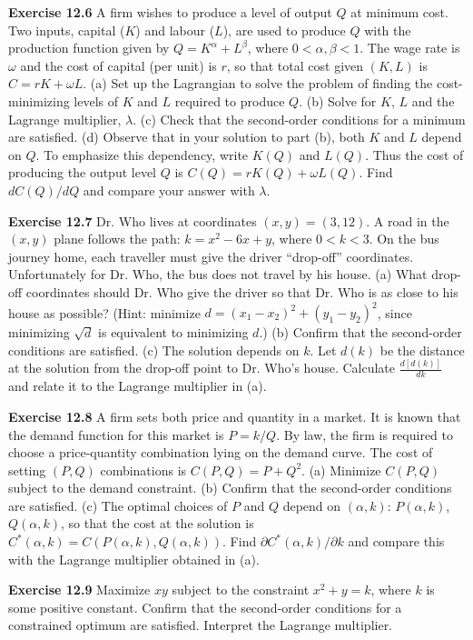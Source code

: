 \begin{original}
\textbf{Exercise 12.6} A firm wishes to produce a level of output $Q$ at minimum cost. Two inputs, capital ($K$) and labour ($L$), are used to produce $Q$ with the production function given by $Q = K^\alpha + L^\beta$, where $0 < \alpha, \beta < 1$. The wage rate is $\omega$ and the cost of capital (per unit) is $r$, so that total cost given $(K, L)$ is $C = rK + \omega L$.
(a) Set up the Lagrangian to solve the problem of finding the cost-minimizing levels of $K$ and $L$ required to produce $Q$.
(b) Solve for $K$, $L$ and the Lagrange multiplier, $\lambda$.
(c) Check that the second-order conditions for a minimum are satisfied.
(d) Observe that in your solution to part (b), both $K$ and $L$ depend on $Q$. To emphasize this dependency, write $K(Q)$ and $L(Q)$. Thus the cost of producing the output level $Q$ is $C(Q) = rK(Q) + \omega L(Q)$. Find $dC(Q)/dQ$ and compare your answer with $\lambda$.

\textbf{Exercise 12.7} Dr. Who lives at coordinates $(x, y) = (3,12)$. A road in the $(x, y)$ plane follows the path: $k = x^2 - 6x + y$, where $0 < k < 3$. On the bus journey home, each traveller must give the driver ``drop-off'' coordinates. Unfortunately for Dr. Who, the bus does not travel by his house.
(a) What drop-off coordinates should Dr. Who give the driver so that Dr. Who is as close to his house as possible? (Hint: minimize $d = (x_1 - x_2)^2 + (y_1 - y_2)^2$, since minimizing $\sqrt{d}$ is equivalent to minimizing $d$.)
(b) Confirm that the second-order conditions are satisfied.
(c) The solution depends on $k$. Let $d(k)$ be the distance at the solution from the drop-off point to Dr. Who's house. Calculate $\frac{d[d(k)]}{dk}$ and relate it to the Lagrange multiplier in (a).

\textbf{Exercise 12.8} A firm sets both price and quantity in a market. It is known that the demand function for this market is $P = k/Q$. By law, the firm is required to choose a price-quantity combination lying on the demand curve. The cost of setting $(P,Q)$ combinations is $C(P,Q) = P + Q^2$.
(a) Minimize $C(P,Q)$ subject to the demand constraint.
(b) Confirm that the second-order conditions are satisfied.
(c) The optimal choices of $P$ and $Q$ depend on $(\alpha, k)$: $P(\alpha, k)$, $Q(\alpha, k)$, so that the cost at the solution is $C^*(\alpha, k) = C(P(\alpha, k), Q(\alpha, k))$. Find $\partial C^*(\alpha, k)/\partial k$ and compare this with the Lagrange multiplier obtained in (a).

\textbf{Exercise 12.9} Maximize $xy$ subject to the constraint $x^2 + y = k$, where $k$ is some positive constant. Confirm that the second-order conditions for a constrained optimum are satisfied. Interpret the Lagrange multiplier.


\end{original}
